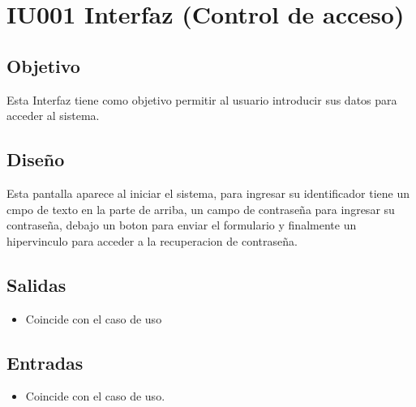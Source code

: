 \section{IU001 Interfaz (Control de acceso)}

\subsection{Objetivo}
Esta Interfaz tiene como objetivo permitir al usuario introducir sus datos para acceder al sistema.
\subsection{Diseño}
 Esta pantalla  aparece al iniciar el sistema, para ingresar su identificador tiene un cmpo de texto en la parte de arriba, un campo de contraseña para ingresar su contraseña, debajo un boton para enviar el formulario y finalmente un hipervinculo para acceder a la recuperacion de contraseña. 



\subsection{Salidas}


	\begin{itemize}
		\item Coincide con el caso de uso
	\end{itemize}
	
\subsection{Entradas}

	\begin{itemize}
		\item Coincide con el caso de uso.
	\end{itemize}

